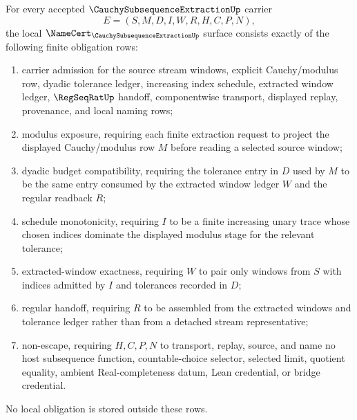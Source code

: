 \begin{theorem}
\label{thm:cauchy-subsequence-extraction-obligation-surface}
For every accepted $\CauchySubsequenceExtractionUp$ carrier
$$
E=(S,M,D,I,W,R,H,C,P,N),
$$
the local $\NameCert_{\CauchySubsequenceExtractionUp}$ surface consists exactly of the following finite obligation rows:
\begin{enumerate}
\item carrier admission for the source stream windows, explicit Cauchy/modulus row, dyadic tolerance ledger, increasing index schedule, extracted window ledger, $\RegSeqRatUp$ handoff, componentwise transport, displayed replay, provenance, and local naming rows;
\item modulus exposure, requiring each finite extraction request to project the displayed Cauchy/modulus row $M$ before reading a selected source window;
\item dyadic budget compatibility, requiring the tolerance entry in $D$ used by $M$ to be the same entry consumed by the extracted window ledger $W$ and the regular readback $R$;
\item schedule monotonicity, requiring $I$ to be a finite increasing unary trace whose chosen indices dominate the displayed modulus stage for the relevant tolerance;
\item extracted-window exactness, requiring $W$ to pair only windows from $S$ with indices admitted by $I$ and tolerances recorded in $D$;
\item regular handoff, requiring $R$ to be assembled from the extracted windows and tolerance ledger rather than from a detached stream representative;
\item non-escape, requiring $H,C,P,N$ to transport, replay, source, and name no host subsequence function, countable-choice selector, selected limit, quotient equality, ambient Real-completeness datum, Lean credential, or bridge credential.
\end{enumerate}
No local obligation is stored outside these rows.
\end{theorem}
